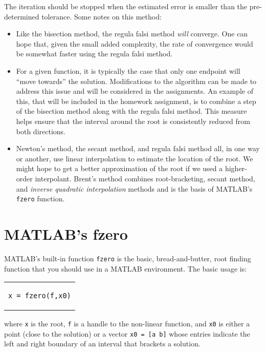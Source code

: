 The iteration should be stopped when the estimated error is smaller than the pre-determined tolerance.  Some notes on this method:
\begin{itemize}
\item Like the bisection method, the regula falsi method \emph{will} converge.  One can hope that, given the small added complexity, the rate of convergence would be somewhat faster using the regula falsi method.
\item For a given function, it is typically the case that only one endpoint will ``move towards'' the solution.  Modifications to the algorithm can be made to address this issue and will be considered in the assignments.  An example of this, that will be included in the homework assignment, is to combine a step of the bisection method along with the regula falsi method.  This measure helps ensure that the interval around the root is consistently reduced from both directions. 
\item Newton's method, the secant method, and regula falsi method all, in one way or another, use linear interpolation to estimate the location of the root.  We might hope to get a better approximation of the root if we used a higher-order interpolant. Brent's method combines root-bracketing, secant method, and \emph{inverse quadratic interpolation} methods and is the basis of MATLAB's \lstinline[style=myMatlab]{fzero} function.\cite{forsythe1977computer}
\end{itemize}


\section{MATLAB's fzero}
MATLAB's built-in function \lstinline[style=myMatlab]{fzero} is the basic, bread-and-butter, root finding function that you should use in a MATLAB environment.  The basic usage is:
\begin{center}
\begin{tabular}{c}
\begin{lstlisting}[style=myMatlab, frame=none, numbers=none, basicstyle=\large]
x = fzero(f,x0)
\end{lstlisting}
\end{tabular}
\end{center}
where \lstinline[style=myMatlab]{x} is the root, \lstinline[style=myMatlab]{f} is a handle to the non-linear function, and \lstinline[style=myMatlab]{x0} is either a point (close to the solution) or a vector \lstinline[style=myMatlab]{x0 = [a b]} whose entries indicate the left and right boundary of an interval that brackets a solution.

